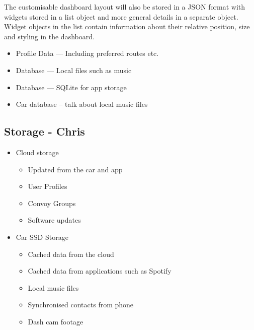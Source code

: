 \documentclass{article}
\begin{document}
The customisable dashboard layout will also be stored in a JSON format with widgets stored in a list object and more general details in a separate object. Widget objects in the list contain information about their relative position, size and styling in the dashboard.




\begin{itemize}
  \item Profile Data --- Including preferred routes etc.
  \item Database --- Local files such as music
  \item Database --- SQLite for app storage
  \item Car database -- talk about local music files
\end{itemize}

\subsection{Storage - Chris}\label{ssec:storage}
\begin{itemize}
  \item Cloud storage%
    \begin{itemize}
      \item Updated from the car and app
      \item User Profiles
      \item Convoy Groups
      \item Software updates
    \end{itemize}
  \item Car SSD Storage
    \begin{itemize}
      \item Cached data from the cloud
      \item Cached data from applications such as Spotify
      \item Local music files
      \item Synchronised contacts from phone
      \item Dash cam footage
    \end{itemize}
\end{itemize}
\end{document}

